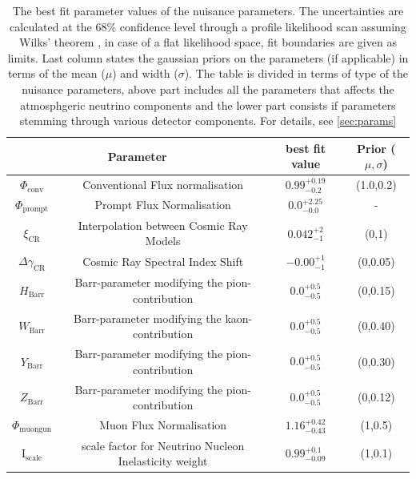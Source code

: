 
\begin{table}[h]
    \caption[The best fit parameter values of the nuisance parameters in HESE-12 flavour fit]{The best fit parameter values of the nuisance parameters. The uncertainties are calculated at the 68\% confidence level through a profile likelihood scan assuming Wilks' theorem \cite{Wilks_thm}, in case of a flat likelihood space, fit boundaries are given as limits. Last column states the gaussian priors on the parameters (if applicable) in terms of the mean ($\mu$) and width ($\sigma$). The table is divided in terms of type of the nuisance parameters, above part includes all the parameters that affects the atmosphgeric neutrino components and the lower part consists if parameters stemming through various detector components. For details, see \ref{sec:params}}
    {\renewcommand{\arraystretch}{1.4}
    \begin{tabular}{ c c |c|c}
        \hline
        \multicolumn{2}{c|}{Parameter}  & best fit value & Prior ($\mu,\sigma$)\\
        \hline
        \hline
        $\Phi_{\mathrm{conv}}$& Conventional Flux normalisation & $0.99_{-0.2}^{+0.19}$ & (1.0,0.2)\\
        \hline
        $\Phi_{\mathrm{prompt}}$& Prompt Flux Normalisation & ${0.0}_{-0.0}^{+2.25}$ & - \\
        \hline
        $\xi_{\mathrm{CR}}$& Interpolation between Cosmic Ray Models & $0.042_{-1}^{+2}$ & (0,1)\\
        \hline
        $\Delta\gamma_{\mathrm{CR}}$& Cosmic Ray Spectral Index Shift & $-0.00_{-1}^{+1}$ & (0,0.05)\\
        \hline
        $H_{\mathrm{Barr}}$& Barr-parameter modifying the pion-contribution & $0.0_{-0.5}^{+0.5}$ & (0,0.15)\\
        \hline
        $W_{\mathrm{Barr}}$& Barr-parameter modifying the kaon-contribution & $0.0_{-0.5}^{+0.5}$ & (0,0.40)\\
        \hline
        $Y_{\mathrm{Barr}}$& Barr-parameter modifying the pion-contribution & $0.0_{-0.5}^{+0.5}$ & (0,0.30)\\
        \hline
        $Z_{\mathrm{Barr}}$& Barr-parameter modifying the pion-contribution & $0.0_{-0.5}^{+0.5}$ & (0,0.12)\\
        \hline
        $\Phi_{\mathrm{muongun}}$ & Muon Flux Normalisation & $1.16_{-0.43}^{+0.42}$ & (1,0.5)\\
        \hline
        $\mathrm{I}_{\mathrm{scale}}$ & scale factor for Neutrino Nucleon Inelasticity weight & $0.99_{-0.09}^{+0.1}$ & (1,0.1)\\
        \hline
        

\end{tabular}}
\end{table}
